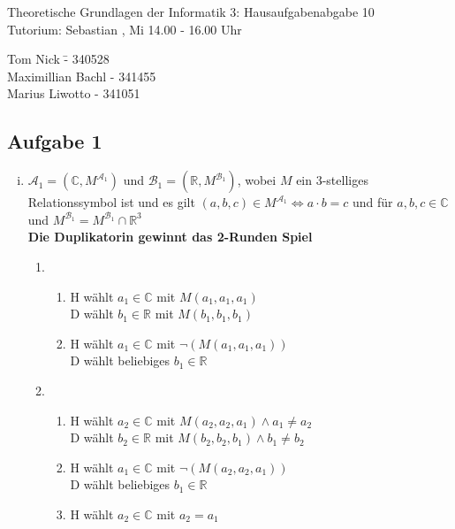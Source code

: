 \documentclass[a4paper,10pt]{article}
\begin{document}
\begin{center}
\Large{Theoretische Grundlagen der Informatik 3: Hausaufgabenabgabe 10} \\
\large{Tutorium: Sebastian , Mi 14.00 - 16.00 Uhr}
\end{center}
\begin{tabbing}
Tom Nick \hspace{2cm}\= - 340528\\
Maximillian Bachl \> - 341455 \\
Marius Liwotto\> -  341051
\end{tabbing}
\subsection*{Aufgabe 1}
\begin{enumerate}[(i)]
	\item $\mathcal{A}_1 = (\mathbb{C},M^{\mathcal{A}_1})$ und $\mathcal{B}_1 = (\mathbb{R}, M^{\mathcal{B}_1})$, wobei $M$ ein 3-stelliges Relationssymbol ist und es gilt $(a,b,c) \in M^{\mathcal{A}_1} \Leftrightarrow a \cdot b = c$ und für $a,b,c \in \mathbb{C}$ und $M^{\mathcal{B}_1} = M^{\mathcal{B}_1} \cap \mathbb{R}^3$ \\
	\textbf{Die Duplikatorin gewinnt das 2-Runden Spiel}
		\begin{enumerate}[1. \text{Zug:}]
			\item  	
			\begin{enumerate}
				\item  	H wählt $a_1 \in \mathbb{C}$ mit $M(a_1,a_1,a_1)$ \\
					D wählt $b_1 \in \mathbb{R}$ mit $M(b_1,b_1,b_1)$
				\item  	H wählt $a_1 \in \mathbb{C}$ mit $\lnot(M(a_1,a_1,a_1))$ \\
					D wählt beliebiges $b_1 \in \mathbb{R}$
			\end{enumerate}
			\item  	
			\begin{enumerate}
				\item  	H wählt $a_2 \in \mathbb{C}$ mit $M(a_2,a_2,a_1) \land a_1 \neq a_2$ \\
					D wählt $b_2 \in \mathbb{R}$ mit $M(b_2,b_2,b_1) \land b_1 \neq b_2$
				\item  	H wählt $a_1 \in \mathbb{C}$ mit $\lnot(M(a_2,a_2,a_1))$ \\
					D wählt beliebiges $b_1 \in \mathbb{R}$
				\item  	H wählt $a_2 \in \mathbb{C}$ mit $a_2 = a_1$ \\

\end{enumerate}
\end{enumerate}
\end{enumerate}
\end{document}
